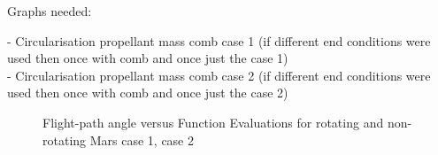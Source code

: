 Graphs needed:


- Circularisation propellant mass comb case 1 (if different end conditions were used then once with comb and once just the case 1) \\
- Circularisation propellant mass comb case 2 (if different end conditions were used then once with comb and once just the case 2) \\


\begin{figure}[H]
\centering
{} 
\caption{Flight-path angle versus Function Evaluations for rotating and non-rotating Mars \protect{} case 1,  \protect{} case 2 } 
\label{fig:FPAvsFunctionEvaluationsCase1combined} 
\end{figure}



